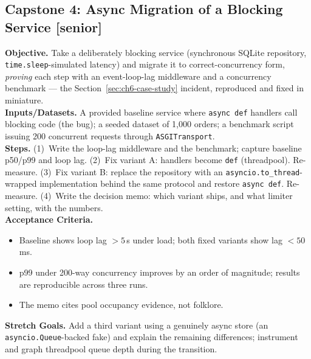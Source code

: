 \subsection{Capstone 4: Async Migration of a Blocking Service [senior]}
\textbf{Objective.} Take a deliberately blocking service (synchronous SQLite
repository, \texttt{time.sleep}-simulated latency) and migrate it to
correct-concurrency form, \emph{proving} each step with an event-loop-lag
middleware and a concurrency benchmark --- the Section~\ref{sec:ch6-case-study}
incident, reproduced and fixed in miniature.\\
\textbf{Inputs/Datasets.} A provided baseline service where
\texttt{async def} handlers call blocking code (the bug); a seeded dataset of
1{,}000 orders; a benchmark script issuing 200 concurrent requests through
\texttt{ASGITransport}.\\
\textbf{Steps.} (1)~Write the loop-lag middleware and the benchmark; capture
baseline p50/p99 and loop lag. (2)~Fix variant A: handlers become
\texttt{def} (threadpool). Re-measure. (3)~Fix variant B: replace the
repository with an \texttt{asyncio.to\_thread}-wrapped implementation behind
the same protocol and restore \texttt{async def}. Re-measure. (4)~Write the
decision memo: which variant ships, and what limiter setting, with the
numbers.\\
\textbf{Acceptance Criteria.}
\begin{itemize}
  \item[$\square$] Baseline shows loop lag $> 5\,$s under load; both fixed
        variants show lag $< 50\,$ms.
  \item[$\square$] p99 under 200-way concurrency improves by an order of
        magnitude; results are reproducible across three runs.
  \item[$\square$] The memo cites pool occupancy evidence, not folklore.
\end{itemize}
\textbf{Stretch Goals.} Add a third variant using a genuinely async store
(an \texttt{asyncio.Queue}-backed fake) and explain the remaining
differences; instrument and graph threadpool queue depth during the
transition.

